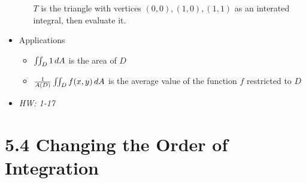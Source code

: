 \documentclass[11pt]{article}
\begin{document}
\begin{itemize}
\begin{itemize}
            \(T\) is the
            triangle with vertices \((0,0),(1,0),(1,1)\)
            as an interated integral, then evaluate it.
    \end{itemize}
  \item Applications
    \begin{itemize}
      \item \(\iint_D 1\,d A\) is the area of \(D\)
      \item \(\frac{1}{A(D)}\iint_D f(x,y)\,d A\) is the average value
            of the function \(f\) restricted to \(D\)
    \end{itemize}
  \item\textit{
    HW: 1-17
  }
\end{itemize}

\section*{5.4 Changing the Order of Integration}
\end{document}
